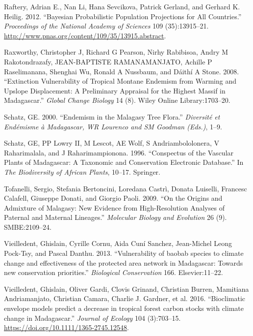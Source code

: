 \documentclass[12pt,]{article}
\begin{document}
\leavevmode\hypertarget{ref-Raftery2012}{}%
Raftery, Adrian E., Nan Li, Hana Sevcikova, Patrick Gerland, and Gerhard
K. Heilig. 2012. ``Bayesian Probabilistic Population Projections for All
Countries.'' \emph{Proceedings of the National Academy of Sciences} 109
(35):13915--21. \url{http://www.pnas.org/content/109/35/13915.abstract}.

\leavevmode\hypertarget{ref-Raxworthy2008}{}%
Raxworthy, Christopher J, Richard G Pearson, Nirhy Rabibisoa, Andry M
Rakotondrazafy, JEAN-BAPTISTE RAMANAMANJATO, Achille P Raselimanana,
Shenghai Wu, Ronald A Nussbaum, and Dáithí A Stone. 2008. ``Extinction
Vulnerability of Tropical Montane Endemism from Warming and Upslope
Displacement: A Preliminary Appraisal for the Highest Massif in
Madagascar.'' \emph{Global Change Biology} 14 (8). Wiley Online
Library:1703--20.

\leavevmode\hypertarget{ref-Schatz2000}{}%
Schatz, GE. 2000. ``Endemism in the Malagasy Tree Flora.''
\emph{Diversité et Endémisme à Madagascar, WR Lourenco and SM Goodman
(Eds.)}, 1--9.

\leavevmode\hypertarget{ref-Schatz1996}{}%
Schatz, GE, PP Lowry II, M Lescot, AE Wolf, S Andriambololonera, V
Raharimalala, and J Raharimampionona. 1996. ``Conspectus of the Vascular
Plants of Madagascar: A Taxonomic and Conservation Electronic
Database.'' In \emph{The Biodiversity of African Plants}, 10--17.
Springer.

\leavevmode\hypertarget{ref-Tofanelli2009}{}%
Tofanelli, Sergio, Stefania Bertoncini, Loredana Castrì, Donata
Luiselli, Francesc Calafell, Giuseppe Donati, and Giorgio Paoli. 2009.
``On the Origins and Admixture of Malagasy: New Evidence from
High-Resolution Analyses of Paternal and Maternal Lineages.''
\emph{Molecular Biology and Evolution} 26 (9). SMBE:2109--24.

\leavevmode\hypertarget{ref-Vieilledent2013a}{}%
Vieilledent, Ghislain, Cyrille Cornu, Aida Cuní Sanchez, Jean-Michel
Leong Pock-Tsy, and Pascal Danthu. 2013. ``Vulnerability of baobab
species to climate change and effectiveness of the protected area
network in Madagascar: Towards new conservation priorities.''
\emph{Biological Conservation} 166. Elsevier:11--22.

\leavevmode\hypertarget{ref-Vieilledent2016}{}%
Vieilledent, Ghislain, Oliver Gardi, Clovis Grinand, Christian Burren,
Mamitiana Andriamanjato, Christian Camara, Charlie J. Gardner, et al.
2016. ``Bioclimatic envelope models predict a decrease in tropical
forest carbon stocks with climate change in Madagascar.'' \emph{Journal
of Ecology} 104 (3):703--15.
\url{https://doi.org/10.1111/1365-2745.12548}.
\end{document}
